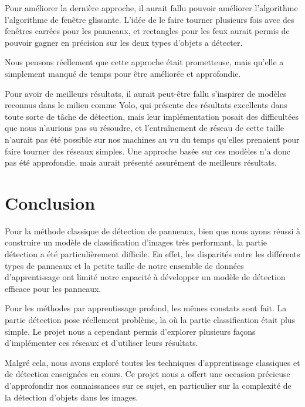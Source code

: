 \documentclass[twocolumn,10pt]{article}
\begin{document}
    Pour améliorer la dernière approche, il aurait fallu pouvoir améliorer l'algorithme l'algorithme de fenêtre glissante. L'idée de le faire tourner plusieurs fois avec des fenêtres carrées pour les panneaux, et rectangles pour les feux aurait permis de pouvoir gagner en précision sur les deux types d'objets a détecter.

    Nous pensons réellement que cette approche était prometteuse, mais qu'elle a simplement manqué de temps pour être améliorée et approfondie.

    Pour avoir de meilleurs résultats, il aurait peut-être fallu s'inspirer de modèles reconnus dans le milieu comme Yolo, qui présente des résultats excellents dans toute sorte de tâche de détection, mais leur implémentation posait des difficultées que nous n'aurions pas su résoudre, et l'entraînement de réseau de cette taille n'aurait pas été possible sur nos machines au vu du temps qu'elles prenaient pour faire tourner des réseaux simples. Une approche basée sur ces modèles n'a donc pas été approfondie, mais aurait présenté assurément de meilleurs résultats.

    \section{Conclusion}

    Pour la méthode classique de détection de panneaux, bien que nous ayons réussi à construire un modèle de classification d'images très performant, la partie détection a été particulièrement difficile. En effet, les disparités entre les différents types de panneaux et la petite taille de notre ensemble de données d'apprentissage ont limité notre capacité à développer un modèle de détection efficace pour les panneaux.

    Pour les méthodes par apprentissage profond, les mêmes constats sont fait. La partie détection pose réellement problème, la où la partie classification était plus simple. Le projet nous a cependant permis d'explorer plusieurs façons d'implémenter ces réseaux et d'utiliser leurs résultats.

    Malgré cela, nous avons exploré toutes les techniques d'apprentissage classiques et de détection enseignées en cours. Ce projet nous a offert une occasion précieuse d'approfondir nos connaissances sur ce sujet, en particulier sur la complexité de la détection d'objets dans les images.
\end{document}

